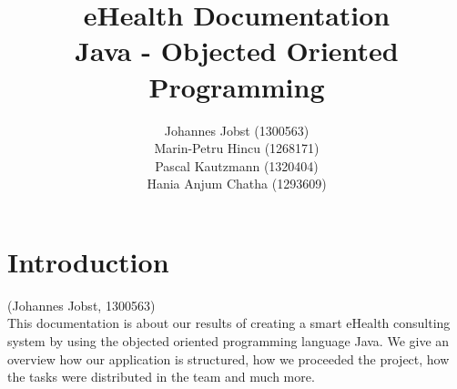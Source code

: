 \documentclass[a4paper, 12pt]{report}
\title{\textbf{eHealth Documentation}\\Java - Objected Oriented Programming}
\author{Johannes Jobst (1300563)\\Marin-Petru Hincu (1268171)\\Pascal Kautzmann (1320404)\\Hania Anjum Chatha (1293609)}
\begin{document}
\maketitle


\tableofcontents
\listoffigures

\chapter{Introduction}
{\tiny (Johannes Jobst, 1300563)\\}
This documentation is about our results of creating a smart eHealth consulting system by using the objected oriented programming language Java. We give an overview how our application is structured, how we proceeded the project, how the tasks were distributed in the team and much more.
\\
\\
\\
\end{document}
